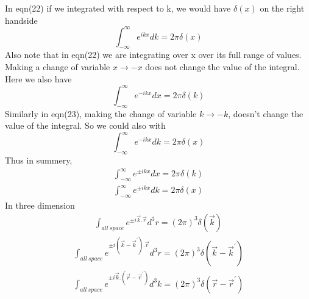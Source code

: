 In eqn(22) if we integrated with respect to k, we would have $\delta (x)$ on the right handside
\begin{equation}
\int_{-\infty}^{\infty} e^{ikx} dk = 2\pi \delta (x) 
\end{equation}
Also note that in eqn(22) we are integrating over x over its full range of values. Making a change of variable $x \to -x$ does not change the value of the integral. Here we also have 
\begin{equation}
\int_{-\infty}^{\infty} e^{-ikx} dx = 2\pi \delta (k) 
\end{equation}
Similarly in eqn(23), making the change of variable $k \to -k$, doesn't change the value of the integral. So we could also with 
\begin{equation}
\int_{-\infty}^{\infty} e^{-ikx} dk = 2\pi \delta (x) 
\end{equation}
Thus in summery,
\begin{align*}
\int_{-\infty}^{\infty} e^{\pm ikx} dx = 2\pi \delta (k) 
\end{align*}
\begin{align*}
\int_{-\infty}^{\infty} e^{\pm ikx} dk = 2\pi \delta (x) 
\end{align*}
In three dimension
\begin{align*}
\int_{all \ space} e^{\pm i \vec{k}.\vec{r}} d^3r = (2\pi)^3 \delta (\vec{k}) 
\end{align*}
\begin{align*}
\int_{all \ space} e^{\pm i (\vec{k} - \vec{k}^\prime).\vec{r}} d^3r = (2\pi)^3 \delta (\vec{k} - \vec{k}^\prime) 
\end{align*}
\begin{align*}
\int_{all \ space} e^{\pm i \vec{k}.(\vec{r} - \vec{r}^\prime)} d^3k = (2\pi)^3 \delta (\vec{r} - \vec{r}^\prime) 
\end{align*}


